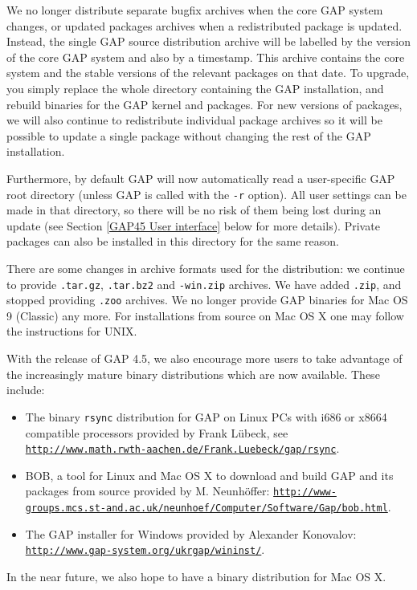 \documentclass[a4paper,11pt]{report}
\begin{document}
{{{  We no longer distribute separate bugfix archives when the core \textsf{GAP} system changes, or updated packages archives when a redistributed package is
updated. Instead, the single \textsf{GAP} source distribution archive will be labelled by the version of the core \textsf{GAP} system and also by a timestamp. This archive contains the core system and the
stable versions of the relevant packages on that date. To upgrade, you simply
replace the whole directory containing the \textsf{GAP} installation, and rebuild binaries for the \textsf{GAP} kernel and packages. For new versions of packages, we will also continue to
redistribute individual package archives so it will be possible to update a
single package without changing the rest of the \textsf{GAP} installation. 

 Furthermore, by default \textsf{GAP} will now automatically read a user-specific \textsf{GAP} root directory (unless \textsf{GAP} is called with the \texttt{-r} option). All user settings can be made in that directory, so there will be no
risk of them being lost during an update (see Section \ref{GAP45 User interface} below for more details). Private packages can also be installed in this
directory for the same reason. 

 There are some changes in archive formats used for the distribution: we
continue to provide \texttt{.tar.gz}, \texttt{.tar.bz2} and \texttt{-win.zip} archives. We have added \texttt{.zip}, and stopped providing \texttt{.zoo} archives. We no longer provide GAP binaries for Mac OS 9 (Classic) any more.
For installations from source on Mac OS X one may follow the instructions for
UNIX. 

  With the release of \textsf{GAP} 4.5, we also encourage more users to take advantage of the increasingly mature
binary distributions which are now available. These include: 
\begin{itemize}
\item  The binary \texttt{rsync} distribution for \textsf{GAP} on Linux PCs with i686 or x86{\textunderscore}64 compatible processors
provided by Frank L{\"u}beck, see \href{http://www.math.rwth-aachen.de/~Frank.Luebeck/gap/rsync} {\texttt{http://www.math.rwth-aachen.de/\texttt{}Frank.Luebeck/gap/rsync}}. 
\item  \textsf{BOB}, a tool for Linux and Mac OS X to download and build \textsf{GAP} and its packages from source provided by M. Neunh{\"o}ffer: \href{http://www-groups.mcs.st-and.ac.uk/~neunhoef/Computer/Software/Gap/bob.html} {\texttt{http://www-groups.mcs.st-and.ac.uk/\texttt{}neunhoef/Computer/Software/Gap/bob.html}}. 
\item  The \textsf{GAP} installer for Windows provided by Alexander Konovalov: \href{http://www.gap-system.org/ukrgap/wininst/} {\texttt{http://www.gap-system.org/ukrgap/wininst/}}. 
\end{itemize}
 In the near future, we also hope to have a binary distribution for Mac OS X.  

}}}
\end{document}
